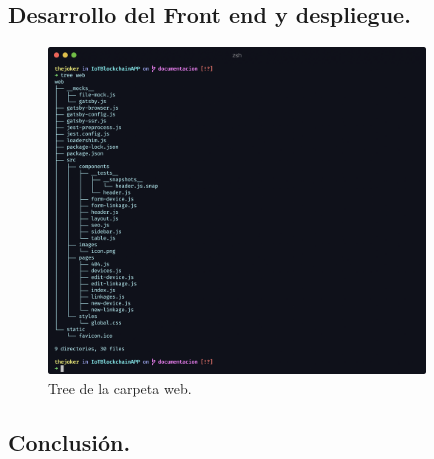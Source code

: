 \subsection{Desarrollo del Front end y despliegue.}

\begin{figure}[ht!]
  \centering
  \includegraphics[width=10cm]{imagenes/desarrollo/tree_web}
  \caption{Tree de la carpeta web.}
  \label{fig:tree-web}
\end{figure}

\subsection{Conclusión.}

\newpage